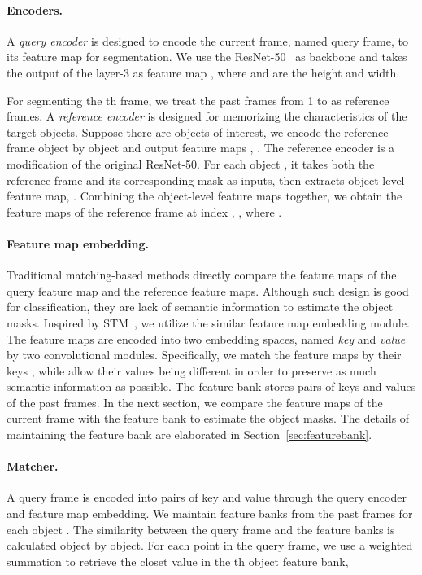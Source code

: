 \documentclass{article}
\begin{document}
\paragraph{Encoders.}
A \emph{query encoder} is designed to encode the current frame, named query frame, to its feature map for segmentation.
We use the ResNet-50~\cite{he_deep_2016} as backbone and takes the output of the layer-3 as  feature map , where  and  are the height and width.

For segmenting the th frame, we treat the past frames from 1 to  as reference frames.
A \emph{reference encoder} is designed for memorizing the characteristics of the target objects.
Suppose there are  objects of interest, we encode the reference frame object by object and output  feature maps , .
The reference encoder is a modification of the original ResNet-50.
For each object , it takes both the reference frame and its corresponding mask as inputs, then extracts object-level feature map, .
Combining the object-level feature maps together, we obtain the feature maps of the reference frame at index , , where .

\paragraph{Feature map embedding.}
Traditional matching-based methods directly compare the feature maps of the query feature map and the reference feature maps. 
Although such design is good for classification, they are lack of semantic information to estimate the object masks.
Inspired by STM~\cite{oh_video_2019}, we utilize the similar feature map embedding module.
The feature maps are encoded into two embedding spaces, named \emph{key}  and \emph{value}  by two convolutional modules.
Specifically, we match the feature maps by their keys , while allow their values  being different in order to preserve as much semantic information as possible.
The feature bank stores pairs of keys and values of the past frames.
In the next section, we compare the feature maps of the current frame with the feature bank to estimate the object masks.
The details of maintaining the feature bank are elaborated in Section~\ref{sec:featurebank}.

\paragraph{Matcher.}
A query frame is encoded into pairs of key  and value  through the query encoder and  feature map embedding.
We maintain  feature banks  from the past frames for each object .
The similarity between the query frame and the feature banks is calculated object by object.
For each point  in the query frame, we use a weighted summation to retrieve the closet value  in the th object feature bank, 
\end{document}
